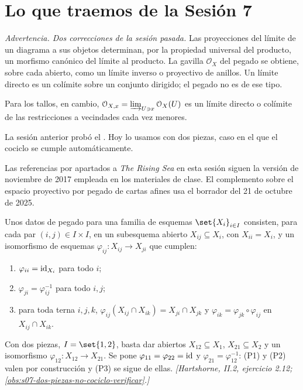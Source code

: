 \section{Lo que traemos de la Sesión 7}

\emph{Advertencia. Dos correcciones de la sesión pasada.} Las proyecciones del límite de un diagrama a sus objetos determinan, por la propiedad universal del producto, un morfismo canónico del límite al producto. La gavilla $\mathcal O_X$ del pegado se obtiene, sobre cada abierto, como un límite inverso o proyectivo de anillos. Un límite directo es un colímite sobre un conjunto dirigido; el pegado no es de ese tipo.

Para los tallos, en cambio, $\mathcal O_{X,x}=\varinjlim_{U\ni x}\mathcal O_X(U)$ es un límite directo o colímite de las restricciones a vecindades cada vez menores.

La sesión anterior probó el . Hoy lo usamos con dos piezas, caso en el que el cociclo se cumple automáticamente.

Las referencias por apartados a \emph{The Rising Sea} en esta sesión siguen la versión de noviembre de 2017 empleada en los materiales de clase. El complemento sobre el espacio proyectivo por pegado de cartas afines usa el borrador del 21 de octubre de 2025.

\begin{defi}
\label{defi:s08-datos-pegado}
Unos datos de pegado para una familia de esquemas $\set{X_i}_{i\in I}$ consisten, para cada par $(i,j)\in I\times I$, en un subesquema abierto $X_{ij}\subseteq X_i$, con $X_{ii}=X_i$, y un isomorfismo de esquemas $\varphi_{ij}\colon X_{ij}\to X_{ji}$ que cumplen:
\begin{enumerate}[label=(P\arabic*), leftmargin=2.1em]
\item $\varphi_{ii}=\operatorname{id}_{X_i}$ para todo $i$;
\item $\varphi_{ji}=\varphi_{ij}^{-1}$ para todo $i,j$;
\item para toda terna $i,j,k$, $\varphi_{ij}(X_{ij}\cap X_{ik})=X_{ji}\cap X_{jk}$ y $\varphi_{ik}=\varphi_{jk}\circ\varphi_{ij}$ en $X_{ij}\cap X_{ik}$.
\end{enumerate}
\end{defi}

Con dos piezas, $I=\set{1,2}$, basta dar abiertos $X_{12}\subseteq X_1$, $X_{21}\subseteq X_2$ y un isomorfismo $\varphi_{12}\colon X_{12}\to X_{21}$. Se pone $\varphi_{11}=\varphi_{22}=\operatorname{id}$ y $\varphi_{21}=\varphi_{12}^{-1}$: (P1) y (P2) valen por construcción y (P3) se sigue de ellas. \emph{[Hartshorne, II.2, ejercicio 2.12; \cref{obs:s07-dos-piezas-no-cociclo-verificar}.]}

